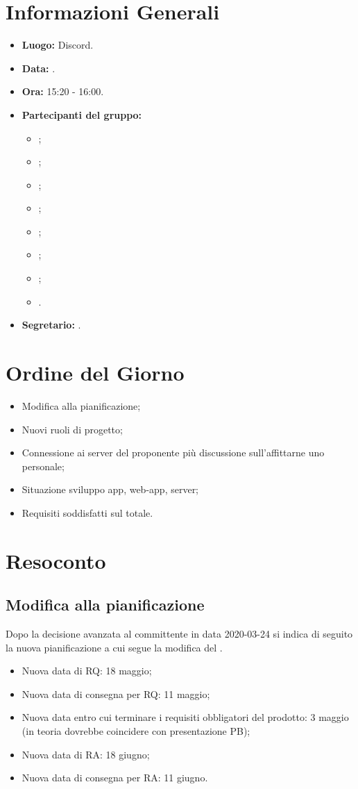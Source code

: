 \section{Informazioni Generali}
\begin{itemize}
\item \textbf{Luogo:} Discord.
\item \textbf{Data:} \Data.
\item \textbf{Ora:} 15:20 - 16:00.
\item \textbf{Partecipanti del gruppo:}
	\begin{itemize}
		\item \AT{}; 
		\item \BR{};
		\item \CE{}; 
		\item \DF{};
		\item \LD{};
		\item \MC{};
		\item \PF{};
		\item \SE{}.
	\end{itemize} 
\item \textbf{Segretario:} \AT{}.
\end{itemize}

\section{Ordine del Giorno}
\begin{itemize}
	\item Modifica alla pianificazione;
	\item Nuovi ruoli di progetto;
	\item Connessione ai server del proponente più discussione sull'affittarne uno personale;
	\item Situazione sviluppo app, web-app, server;
	\item Requisiti soddisfatti sul totale.
\end{itemize}

\section{Resoconto}

\subsection{Modifica alla pianificazione}
Dopo la decisione avanzata al committente in data 2020-03-24 si indica di seguito la nuova pianificazione a cui segue la modifica del \PdP{}.
\begin{itemize}
	\item Nuova data di RQ: 18 maggio;
	\item Nuova data di consegna per RQ: 11 maggio;
	\item Nuova data entro cui terminare i requisiti obbligatori del prodotto: 3 maggio (in teoria dovrebbe coincidere con presentazione PB);
	\item Nuova data di RA: 18 giugno;
	\item Nuova data di consegna per RA: 11 giugno.
\end{itemize}

